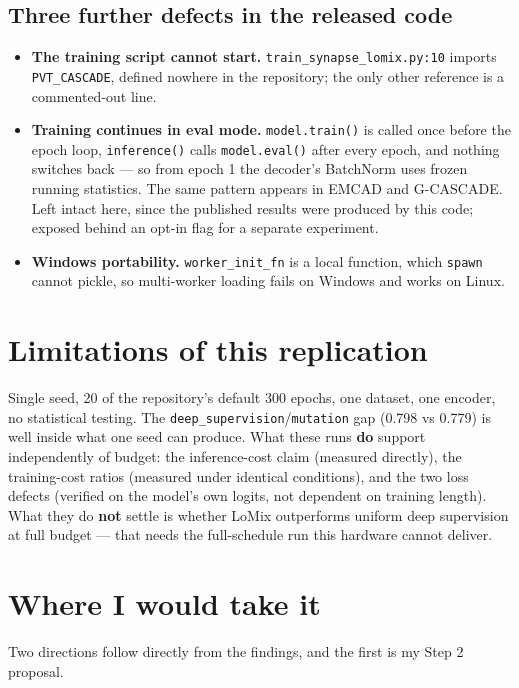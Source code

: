\documentclass[11pt,a4paper]{article}
\newcommand{\code}[1]{\texttt{\small #1}}
\begin{document}
\subsection{Three further defects in the released code}

\begin{itemize}
\item \textbf{The training script cannot start.}
\code{train\_synapse\_lomix.py:10} imports \code{PVT\_CASCADE}, defined nowhere
in the repository; the only other reference is a commented-out line.
\item \textbf{Training continues in eval mode.} \code{model.train()} is called
once before the epoch loop, \code{inference()} calls \code{model.eval()} after
every epoch, and nothing switches back --- so from epoch 1 the decoder's
BatchNorm uses frozen running statistics. The same pattern appears in EMCAD and
G-CASCADE. Left intact here, since the published results were produced by this
code; exposed behind an opt-in flag for a separate experiment.
\item \textbf{Windows portability.} \code{worker\_init\_fn} is a local function,
which \code{spawn} cannot pickle, so multi-worker loading fails on Windows and
works on Linux.
\end{itemize}

\section{Limitations of this replication}

Single seed, 20 of the repository's default 300 epochs, one dataset, one
encoder, no statistical testing.
The \code{deep\_supervision}/\code{mutation} gap (0.798 vs 0.779) is well inside
what one seed can produce. What these runs \textbf{do} support independently of
budget: the inference-cost claim (measured directly), the training-cost ratios
(measured under identical conditions), and the two loss defects (verified on the
model's own logits, not dependent on training length). What they do \textbf{not}
settle is whether LoMix outperforms uniform deep supervision at full budget ---
that needs the full-schedule run this hardware cannot deliver.

\section{Where I would take it}

Two directions follow directly from the findings, and the first is my Step 2
proposal.
\end{document}
